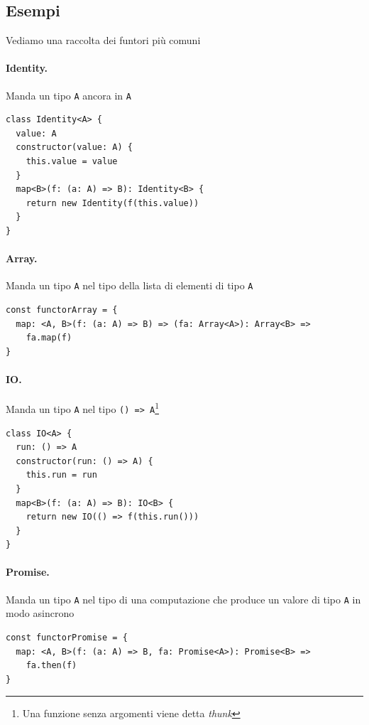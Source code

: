 \documentclass[12pt]{article}
\begin{document}
\subsection{Esempi}

Vediamo una raccolta dei funtori più comuni

\paragraph{Identity.}

Manda un tipo \texttt{A} ancora in \texttt{A}

\begin{verbatim}
class Identity<A> {
  value: A
  constructor(value: A) {
    this.value = value
  }
  map<B>(f: (a: A) => B): Identity<B> {
    return new Identity(f(this.value))
  }
}
\end{verbatim}

\paragraph{Array.}

Manda un tipo \texttt{A} nel tipo della lista di elementi di tipo \texttt{A}

\begin{verbatim}
const functorArray = {
  map: <A, B>(f: (a: A) => B) => (fa: Array<A>): Array<B> =>
    fa.map(f)
}
\end{verbatim}

\paragraph{IO.}

Manda un tipo \texttt{A} nel tipo \texttt{() => A}\footnote{Una funzione senza argomenti viene detta \emph{thunk}}

\begin{verbatim}
class IO<A> {
  run: () => A
  constructor(run: () => A) {
    this.run = run
  }
  map<B>(f: (a: A) => B): IO<B> {
    return new IO(() => f(this.run()))
  }
}
\end{verbatim}

\paragraph{Promise.}

Manda un tipo \texttt{A} nel tipo di una computazione che produce un valore di tipo \texttt{A} in modo asincrono

\begin{verbatim}
const functorPromise = {
  map: <A, B>(f: (a: A) => B, fa: Promise<A>): Promise<B> =>
    fa.then(f)
}
\end{verbatim}
\end{document}
